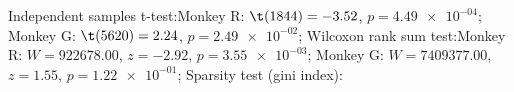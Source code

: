 Independent samples t-test:Monkey R: $\t(1844) = -3.52$, $p = \num{4.49e-04}$; 
Monkey G: $\t(5620) = 2.24$, $p = \num{2.49e-02}$; 
Wilcoxon rank sum test:Monkey R: $W = 922678.00$, $z = -2.92$, $p = \num{3.55e-03}$; 
Monkey G: $W = 7409377.00$, $z = 1.55$, $p = \num{1.22e-01}$; 
Sparsity test (gini index):